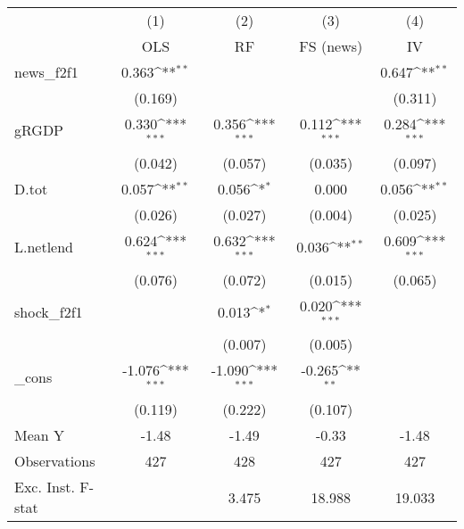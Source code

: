 {
\def\sym#1{\ifmmode^{#1}\else\(^{#1}\)\fi}
\begin{tabular}{l*{4}{c}}
\toprule
            &\multicolumn{1}{c}{(1)}&\multicolumn{1}{c}{(2)}&\multicolumn{1}{c}{(3)}&\multicolumn{1}{c}{(4)}\\
            &\multicolumn{1}{c}{OLS}&\multicolumn{1}{c}{RF}&\multicolumn{1}{c}{FS (news)}&\multicolumn{1}{c}{IV}\\
\midrule
news\_f2f1   &       0.363\sym{**} &                     &                     &       0.647\sym{**} \\
            &     (0.169)         &                     &                     &     (0.311)         \\
\addlinespace
gRGDP       &       0.330\sym{***}&       0.356\sym{***}&       0.112\sym{***}&       0.284\sym{***}\\
            &     (0.042)         &     (0.057)         &     (0.035)         &     (0.097)         \\
\addlinespace
D.tot       &       0.057\sym{**} &       0.056\sym{*}  &       0.000         &       0.056\sym{**} \\
            &     (0.026)         &     (0.027)         &     (0.004)         &     (0.025)         \\
\addlinespace
L.netlend   &       0.624\sym{***}&       0.632\sym{***}&       0.036\sym{**} &       0.609\sym{***}\\
            &     (0.076)         &     (0.072)         &     (0.015)         &     (0.065)         \\
\addlinespace
shock\_f2f1  &                     &       0.013\sym{*}  &       0.020\sym{***}&                     \\
            &                     &     (0.007)         &     (0.005)         &                     \\
\addlinespace
\_cons      &      -1.076\sym{***}&      -1.090\sym{***}&      -0.265\sym{**} &                     \\
            &     (0.119)         &     (0.222)         &     (0.107)         &                     \\
\midrule
Mean Y      &       -1.48         &       -1.49         &       -0.33         &       -1.48         \\
Observations&         427         &         428         &         427         &         427         \\
Exc. Inst. F-stat&                     &       3.475         &      18.988         &      19.033         \\
\bottomrule
\end{tabular}
}
